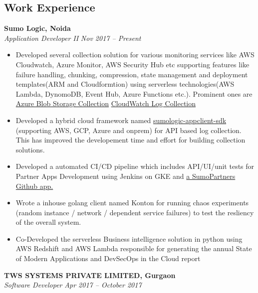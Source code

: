 \documentclass[margin,line]{resume}
\begin{document}
\begin{resume}
    \section{\mysidestyle Work Experience}
    \textbf{Sumo Logic, Noida}\\
        \textsl{Application Developer II} \hfill \textsl{Nov 2017 -- Present}
        \vspace{1mm}%
        \begin{itemize}
            \item Developed several collection solution for various monitoring services like AWS Cloudwatch, Azure Monitor, AWS Security Hub etc supporting features like failure handling, chunking, compression, state management and deployment templates(ARM and Cloudformtion) using serverless technologies(AWS Lambda, DynomoDB, Event Hub, Azure Functions etc.). Prominent ones are 
            \subitem \href{https://help.sumologic.com/Send-Data/Collect-from-Other-Data-Sources/Azure_Blob_Storage}{Azure Blob Storage Collection}
            \subitem \href{https://help.sumologic.com/Send-Data/Collect-from-Other-Data-Sources/Amazon-CloudWatch-Logs}{CloudWatch Log Collection}
            \item Developed a hybrid cloud framework named \href{https://pypi.org/project/sumologic-appclient-sdk/}{sumologic-appclient-sdk} (supporting AWS, GCP, Azure and onprem) for API based log collection. This has improved the developement time and effort for building collection solutions. 
            \item Developed a automated CI/CD pipeline which includes API/UI/unit tests for Partner Apps Development using Jenkins on GKE and \href{https://github.com/apps/sumopartners}{a SumoPartners Github app.}
            \item Wrote a inhouse golang client named Konton for running chaos experiments (random instance / network / dependent service failures) to test the resliency of the overall system.
            \item Co-Developed the serverless Business intelligence solution in python using AWS Redshift and AWS Lambda responsible for generating the annual State of Modern Applications and DevSecOps in the Cloud report
            
        \end{itemize}
    \textbf{TWS SYSTEMS PRIVATE LIMITED, Gurgaon}\\
           \textsl{Software Developer} \hfill \textsl{Apr 2017 -- October 2017} \vspace{1mm}%
    \begin{itemize}


\end{itemize}
\end{resume}
\end{document}
